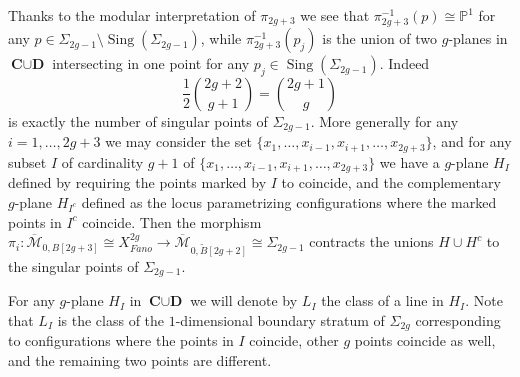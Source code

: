 \documentclass[a4paper,10pt]{amsart}
\theoremstyle{definition}
\newcommand{\cM}{\overline{\mathcal{M}}}
\DeclareMathOperator{\Sing}{Sing}
\begin{document}
Thanks to the modular interpretation of $\pi_{2g+3}$ we see that $\pi_{2g+3}^{-1}(p)\cong\mathbb{P}^1$ for any $p\in \Sigma_{2g-1}\setminus \Sing(\Sigma_{2g-1})$, while $\pi_{2g+3}^{-1}(p_j)$ is the union of two $g$-planes in $\textbf{C}\cup \textbf{D}$ intersecting in one point for any $p_j\in\Sing(\Sigma_{2g-1})$. Indeed 
$$\frac{1}{2}\binom{2g+2}{g+1} = \binom{2g+1}{g}$$
is exactly the number of singular points of $\Sigma_{2g-1}$. More generally for any $i = 1,\dots,2g+3$ we may consider the set $\{x_1,\dots,x_{i-1},x_{i+1},\dots,x_{2g+3}\}$, and for any subset $I$ of cardinality $g+1$ of $\{x_1,\dots,x_{i-1},x_{i+1},\dots,x_{2g+3}\}$ we have a $g$-plane $H_I$ defined by requiring the points marked by $I$ to coincide, and the complementary $g$-plane $H_{I^c}$ defined as the locus parametrizing configurations where the marked points in $I^c$ coincide. Then the morphism $\pi_i:\cM_{0,B[2g+3]}\cong  X_{Fano}^{2g}\rightarrow \cM_{0,\widetilde{B}[2g+2]}\cong \Sigma_{2g-1}$ contracts the unions $H\cup H^c$ to the singular points of $\Sigma_{2g-1}$.

For any $g$-plane $H_I$ in $\textbf{C}\cup \textbf{D}$ we will denote by $L_I$ the class of a line in $H_I$. Note that $L_I$ is the class of the $1$-dimensional boundary stratum of $\Sigma_{2g}$ corresponding to configurations where the points in $I$ coincide, other $g$ points coincide as well, and the remaining two points are different. 
\end{document}
